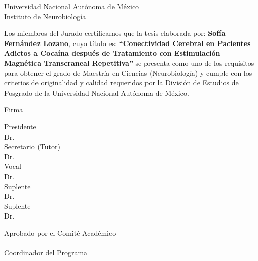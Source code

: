 \begin{center}
    \large
    Universidad Nacional Autónoma de México\\
    Instituto de Neurobiología\\
\end{center}

\vspace{1cm}
\normalsize
Los miembros del Jurado certificamos que la tesis elaborada por:
\textbf{Sofía Fernández Lozano}, cuyo título es:
\textbf{``Conectividad Cerebral en Pacientes Adictos a Cocaína después
de Tratamiento con Estimulación Magnética Transcraneal Repetitiva''} se
presenta como uno de los requisitos para obtener el grado de Maestría en
Ciencias (Neurobiología) y cumple con los criterios de originalidad y calidad
requeridos por la División de Estudios de Posgrado de la Universidad Nacional
Autónoma de México.

\vfill

\begin{flushright}
    \large
    Firma
\end{flushright}

\begin{flushleft}
    Presidente\\
    Dr.\hrulefill\\
    \vspace{3mm}
    Secretario (Tutor)\\
    Dr.\hrulefill\\
    \vspace{3mm}
    Vocal\\
    Dr.\hrulefill\\
    \vspace{3mm}
    Suplente\\
    Dr.\hrulefill\\
    \vspace{3mm}
    Suplente\\
    Dr.\hrulefill\\
\end{flushleft}

\vspace{1cm}

\begin{center}
    Aprobado por el Comité Académico\\
    \vspace{15mm}
    \makebox[7cm]{\hrulefill}\\
    Coordinador del Programa
\end{center}
\newpage
